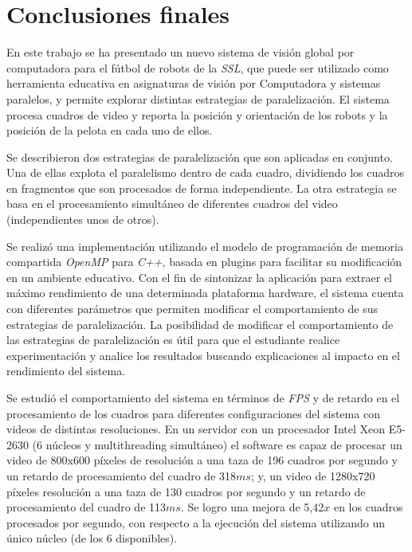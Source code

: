 
\section{Conclusiones finales}

\label{concluciones}

En este trabajo se ha presentado un nuevo sistema de visión global por
computadora para el fútbol de robots de la \emph{SSL}, que puede ser utilizado
como herramienta educativa en asignaturas de visión por Computadora y sistemas
paralelos, y permite explorar distintas estrategias de paralelización. El
sistema procesa cuadros de video y reporta la posición y orientación de los
robots y la posición de la pelota en cada uno de ellos.

Se describieron dos estrategias de paralelización que son aplicadas en conjunto.
Una de ellas explota el paralelismo dentro de cada cuadro, dividiendo los
cuadros en fragmentos que son procesados de forma independiente. La otra
estrategia se basa en el procesamiento simultáneo de diferentes cuadros del
video (independientes unos de otros).

Se realizó una implementación utilizando el modelo de programación de memoria
compartida \emph{OpenMP} para \emph{C++}, basada en plugins para facilitar su
modificación en un ambiente educativo. Con el fin de sintonizar la aplicación
para extraer el máximo rendimiento de una determinada plataforma hardware, el
sistema cuenta con diferentes parámetros que permiten modificar el
comportamiento de sus estrategias de paralelización. La posibilidad de modificar
el comportamiento de las estrategias de paralelización es útil para que el
estudiante realice experimentación y analice los resultados buscando
explicaciones al impacto en el rendimiento del sistema.

Se estudió el comportamiento del sistema en términos de \emph{FPS} y de retardo
en el procesamiento de los cuadros para diferentes configuraciones del sistema
con videos de distintas resoluciones. En un servidor con un procesador Intel
Xeon E5-2630 (6 núcleos y multithreading simultáneo) el software es capaz de
procesar un video de 800x600 píxeles de resolución a una taza de 196 cuadros por
segundo y un retardo de procesamiento del cuadro de 318$ms$; y, un video de
1280x720 píxeles resolución a una taza de 130 cuadros por segundo y un retardo
de procesamiento del cuadro de 113$ms$. Se logro una mejora de 5,42$x$ en los
cuadros procesados por segundo, con respecto a la ejecución del sistema
utilizando un único núcleo (de los 6 disponibles).

